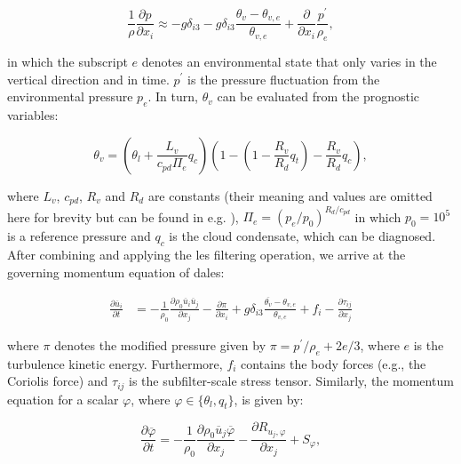 \begin{equation}
    \frac{1}{\rho} \frac{\partial p}{\partial x_i} \approx - g \delta_{i3} - g \delta_{i3} \frac{\theta_v - \theta_{v,e}}{\theta_{v,e}} + \frac{\partial}{\partial x_i} \frac{p^\prime}{\rho_e}, \label{eq:pressure_grad}
\end{equation}

in which the subscript $e$ denotes an environmental state that only varies in the vertical direction and in time. $p^\prime$ is the pressure fluctuation from the environmental pressure $p_e$. In turn, $\theta_v$ can be evaluated from the prognostic variables:

\begin{equation}
    \theta_v = \left( \theta_l + \frac{L_v}{c_{pd} \Pi_e} q_c \right) \left( 1 - \left( 1 - \frac{R_v}{R_d} q_t \right) - \frac{R_v}{R_d} q_c \right), \label{eq:theta_v} 
\end{equation}

where $L_v$, $c_{pd}$, $R_v$ and $R_d$ are constants (their meaning and values are omitted here for brevity but can be found in e.g. \citet{stullIntroductionBoundaryLayer1988}), $\Pi_e = (p_e/p_0)^{R_d/c_{pd}}$ in which $p_0=10^5$ is a reference pressure and $q_c$ is the cloud condensate, which can be diagnosed. After combining  and applying the \acrshort{les} filtering operation, we arrive at the governing momentum equation of \acrshort{dales}:

\begin{align}
    \frac{\partial \overline{u}_i}{\partial t} &= - \frac{1}{\rho_0} \frac{\partial \rho_0 \overline{u}_i \overline{u}_j}{\partial x_j} - \frac{\partial \pi}{\partial x_i} + g \delta_{i3} \frac{\overline{\theta_v} - \theta_{v,e}}{\theta_{v,e}} + f_i - \frac{\partial \tau_{ij}}{\partial x_j} \label{eq:momentum_conservation}
\end{align}

where $\pi$ denotes the modified pressure given by $\pi = p^\prime/\rho_e + 2e/3$, where $e$ is the turbulence kinetic energy. Furthermore, $f_i$ contains the body forces (e.g., the Coriolis force) and $\tau_{ij}$ is the subfilter-scale stress tensor. Similarly, the momentum equation for a scalar $\varphi$, where $\varphi \in \{\theta_l, q_t\}$, is given by:

\begin{equation}
    \frac{\partial \overline{\varphi}}{\partial t} = - \frac{1}{\rho_0} \frac{\partial \rho_0 \overline{u}_j \overline{\varphi}}{\partial x_j} - \frac{\partial R_{u_j,\varphi}}{\partial x_j} + S_\varphi,
\end{equation}

